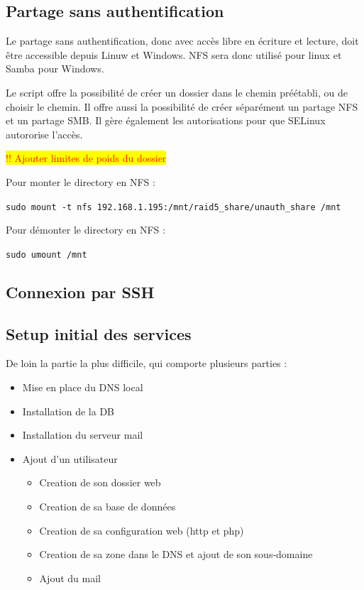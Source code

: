 \documentclass{article}
\begin{document}
\subsection{Partage sans authentification}

Le partage sans authentification, donc avec accès libre en écriture et lecture, doit être accessible depuis Linuw et Windows. NFS sera donc utilisé pour linux et Samba pour Windows. 

Le script offre la possibilité de créer un dossier dans le chemin préétabli, ou de choisir le chemin. Il offre aussi la possibilité de créer séparément un partage NFS et un partage SMB. Il gère également les autorisations pour que SELinux autororise l'accès.

\colorbox{yellow}{\textcolor{red}{!! Ajouter limites de poids du dossier}}

Pour monter le directory en NFS :

\texttt{sudo mount -t nfs 192.168.1.195:/mnt/raid5\_share/unauth\_share /mnt}

Pour démonter le directory en NFS :

\texttt{sudo umount /mnt}


\subsection{Connexion par SSH}
\newpage
\subsection{Setup initial des services}

De loin la partie la plus difficile, qui comporte plusieurs parties :
\begin{itemize}
\item Mise en place du DNS local
\item Installation de la DB
\item Installation du serveur mail
\item Ajout d'un utilisateur
\begin{itemize}
\item Creation de son dossier web
\item Creation de sa base de données
\item Creation de sa configuration web (http et php)
\item Creation de sa zone dans le DNS et ajout de son sous-domaine
\item Ajout du mail
\end{itemize}
\end{itemize}
\end{document}
